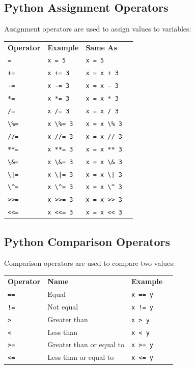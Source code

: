 \documentclass[12pt,a4paper]{article}
\newcommand{\lcode}[1]{%
	\lstinline{#1}%
}
\newcommand{\trcol}[3]{%
	#1 \quad  & #2 & #3 \\
}
\begin{document}
\subsection{Python Assignment Operators}

Assignment operators are used to assign values to variables:

\begin{table}[h]
	\begin{center}
		\begin{tabularx}{.5\textwidth}{lXll}
		\trcol{\textbf{Operator}}{\textbf{Example}}{\textbf{Same As}}
		\trcol{\lcode{=}}{\lcode{x = 5}}{\lcode{x = 5}}
		\trcol{\lcode{+=}}{\lcode{x += 3}}{\lcode{x = x + 3}}
		\trcol{\lcode{-=}}{\lcode{x -= 3}}{\lcode{x = x - 3}}
		\trcol{\lcode{*=}}{\lcode{x *= 3}}{\lcode{x = x * 3}}
		\trcol{\lcode{/=}}{\lcode{x /= 3}}{\lcode{x = x / 3}}
		\trcol{\lcode{\%=}}{\lcode{x \%= 3}}{\lcode{x = x \% 3}}
		\trcol{\lcode{//=}}{\lcode{x //= 3}}{\lcode{x = x // 3}}
		\trcol{\lcode{**=}}{\lcode{x **= 3}}{\lcode{x = x ** 3}}
		\trcol{\lcode{\&=}}{\lcode{x \&= 3}}{\lcode{x = x \& 3}}
		\trcol{\lcode{\|=}}{\lcode{x \|= 3}}{\lcode{x = x \| 3}}
		\trcol{\lcode{\^=}}{\lcode{x \^= 3}}{\lcode{x = x \^ 3}}
		\trcol{\lcode{>>=}}{\lcode{x >>= 3}}{\lcode{x = x >> 3}}
		\trcol{\lcode{<<=}}{\lcode{x <<= 3}}{\lcode{x = x << 3}}
		\end{tabularx}
	\end{center}
\end{table}
\vfill\newpage
\subsection{Python Comparison Operators}

Comparison operators are used to compare two values:

\begin{table}[h]
	\begin{center}
		\begin{tabularx}{.6\textwidth}{lXll}
			\trcol{\bfseries Operator}{\bfseries Name}{\bfseries Example}
\trcol{\lcode{==}}{Equal}{\lcode{x == y}}
\trcol{\lcode{!=}}{Not equal}{\lcode{x != y}}
\trcol{\lcode{>}}{Greater than}{\lcode{x > y}}
\trcol{\lcode{<}}{Less than}{\lcode{x < y}}
\trcol{\lcode{>=}}{Greater than or equal to}{\lcode{x >= y}}
\trcol{\lcode{<=}}{Less than or equal to}{\lcode{x <= y}}
		\end{tabularx}
	\end{center}
\end{table}
\end{document}

